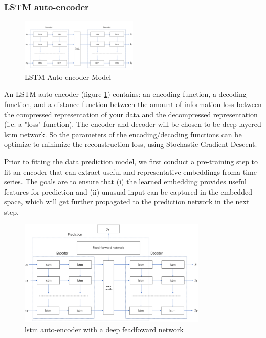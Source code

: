 \documentclass[5p]{elsarticle}
\begin{document}
\subsubsection{LSTM auto-encoder}
\begin{figure}[h]
    \centering
    \includegraphics[width=0.5\textwidth]{auto_encoder.png}
    \caption{LSTM Auto-encoder Model}
    \label{fig:RNN_encoder-decoder}
\end{figure}

An LSTM auto-encoder (figure \ref{fig:RNN_encoder-decoder}) contains: an encoding function, a decoding function, and a distance function between the amount of information loss between the compressed representation of your data and the decompressed representation (i.e. a "loss" function). The encoder and decoder will be chosen to be deep layered lstm network. So the parameters of the encoding/decoding functions can be optimize to minimize the reconstruction loss, using Stochastic Gradient Descent.

Prior to fitting the data prediction model, we first conduct a pre-training step to fit an encoder that can extract useful and representative embeddings froma  time  series.  The  goals  are  to  ensure  that  (i)  the  learned embedding  provides  useful  features  for  prediction  and  (ii) unusual input can be captured in the embedded space, which will get further propagated to the prediction network in the next step.

\begin{figure}[h]
    \centering
    \includegraphics[width=0.8\textwidth]{our_models.png}
    \caption{lstm auto-encoder with a deep feadfoward network}
    \label{fig:our_models}
\end{figure}
\end{document}
